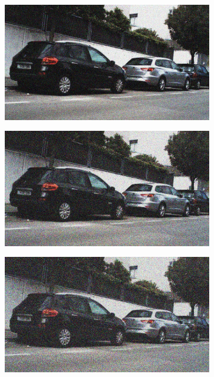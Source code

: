 \documentclass[a4paper]{ctexart}
\begin{document}
\begin{figure}[htbp]
\begin{subfigure}{0.08\textwidth}
			\label{fig：Gamma=0.4, Gauss Noise = 0.1}
		\end{subfigure}
		\begin{subfigure}{0.08\textwidth}
			\captionsetup{font=scriptsize}
			\includegraphics[width=\linewidth]{picture/Edge Detection/degrade/RGB_001 Gamma=0.4, Gauss Noise=0.2}
			\label{fig：Gamma=0.4, Gauss Noise = 0.2}
		\end{subfigure}
		\begin{subfigure}{0.08\textwidth}
			\captionsetup{font=scriptsize}
			\includegraphics[width=\linewidth]{picture/Edge Detection/degrade/RGB_001 Gamma=0.4, Gauss Noise=0.3}
			\label{fig：Gamma=0.4, Gauss Noise = 0.3}
		\end{subfigure}
		\begin{subfigure}{0.08\textwidth}
			\captionsetup{font=scriptsize}
			\includegraphics[width=\linewidth]{picture/Edge Detection/degrade/RGB_001 Gamma=0.4, Gauss Noise=0.4}

\end{subfigure}
\end{figure}
\end{document}
